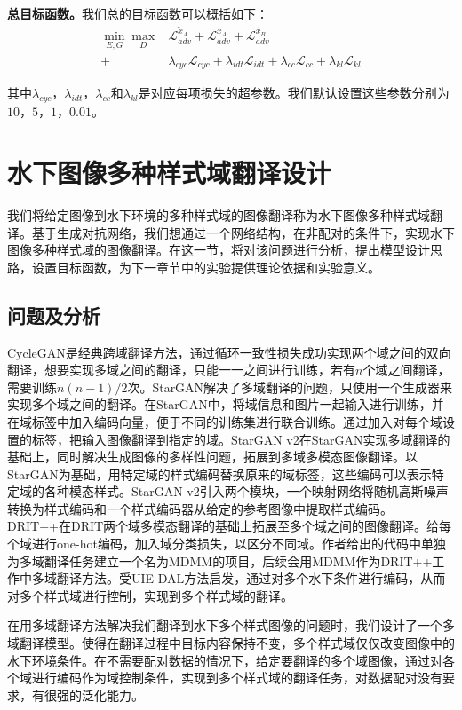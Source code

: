 \textbf{总目标函数。}我们总的目标函数可以概括如下：
\begin{equation}
\label{equ:full}
\begin{aligned}
\min_{E,G}\max_{D} & \mathcal{L}_{adv}^{\tilde{x}_A}+\mathcal{L}_{adv}^{\hat{x}_A}+\mathcal{L}_{adv}^{\hat{x}_B} \\
+&\lambda_{cyc}\mathcal{L}_{cyc}+\lambda_{idt}\mathcal{L}_{idt}+\lambda_{cc}\mathcal{L}_{cc}+\lambda_{kl}\mathcal{L}_{kl}
\end{aligned}
\end{equation}

其中$\lambda_{cyc}$，$\lambda_{idt}$，$\lambda_{cc}$和$\lambda_{kl}$是对应每项损失的超参数。我们默认设置这些参数分别为$10$，$5$，$1$，$0.01$。

\section{水下图像多种样式域翻译设计}
我们将给定图像到水下环境的多种样式域的图像翻译称为水下图像多种样式域翻译。基于生成对抗网络，我们想通过一个网络结构，在非配对的条件下，实现水下图像多种样式域的图像翻译。在这一节，将对该问题进行分析，提出模型设计思路，设置目标函数，为下一章节中的实验提供理论依据和实验意义。

\subsection{问题及分析}

CycleGAN是经典跨域翻译方法，通过循环一致性损失成功实现两个域之间的双向翻译，想要实现多域之间的翻译，只能一一之间进行训练，若有$n$个域之间翻译，需要训练$n(n-1)/2$次。StarGAN解决了多域翻译的问题，只使用一个生成器来实现多个域之间的翻译。在StarGAN中，将域信息和图片一起输入进行训练，并在域标签中加入编码向量，便于不同的训练集进行联合训练。通过加入对每个域设置的标签，把输入图像翻译到指定的域。StarGAN v2在StarGAN实现多域翻译的基础上，同时解决生成图像的多样性问题，拓展到多域多模态图像翻译。以StarGAN为基础，用特定域的样式编码替换原来的域标签，这些编码可以表示特定域的各种模态样式。StarGAN v2引入两个模块，一个映射网络将随机高斯噪声转换为样式编码和一个样式编码器从给定的参考图像中提取样式编码。DRIT++在DRIT两个域多模态翻译的基础上拓展至多个域之间的图像翻译。给每个域进行one-hot编码，加入域分类损失，以区分不同域。作者给出的代码中单独为多域翻译任务建立一个名为MDMM的项目，后续会用MDMM作为DRIT++工作中多域翻译方法。受UIE-DAL方法启发，通过对多个水下条件进行编码，从而对多个样式域进行控制，实现到多个样式域的翻译。

在用多域翻译方法解决我们翻译到水下多个样式图像的问题时，我们设计了一个多域翻译模型。使得在翻译过程中目标内容保持不变，多个样式域仅仅改变图像中的水下环境条件。在不需要配对数据的情况下，给定要翻译的多个域图像，通过对各个域进行编码作为域控制条件，实现到多个样式域的翻译任务，对数据配对没有要求，有很强的泛化能力。

